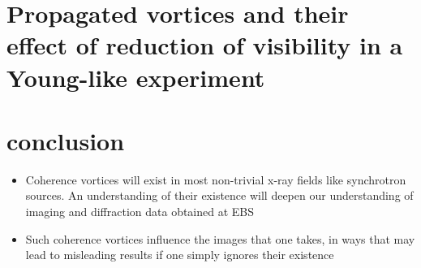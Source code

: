 \documentclass[a4paper,10pt]{article}
\begin{document}
 
 
 
 
 
 
 \section{Propagated vortices and their effect of reduction of visibility in a Young-like experiment}
 
 
 
 
 
 
 
 
\section{conclusion}

\begin{itemize}
\item Coherence vortices will exist in most non-trivial x-ray fields like synchrotron sources. An understanding of their existence will deepen our understanding of imaging and diffraction data obtained at EBS
\item Such coherence vortices influence the images that one takes, in ways that may lead to misleading results if one simply ignores their existence
\end{itemize}
 
 
 
 
 
 
 
 
 
 
 


\end{document}
